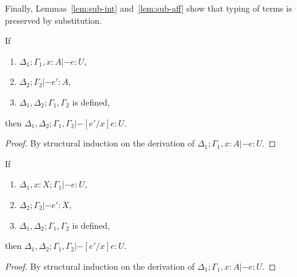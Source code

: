 Finally, Lemmas~\ref{lem:sub-int} and~\ref{lem:sub-aff} show that typing of
terms is preserved by substitution.

\begin{lemma}\label{lem:sub-int}
  If
  \begin{enumerate}
  \item $\Delta_1; \Gamma_1, x : A |- e : U$,
  \item $\Delta_2; \Gamma_2 |- e' : A$,
  \item $\Delta_1,\Delta_2 ; \Gamma_1,\Gamma_2$ is defined,
  \end{enumerate}
  then $\Delta_1,\Delta_2; \Gamma_1,\Gamma_2 |- [e'/x]e : U$.
  \begin{proof}
    By structural induction on the derivation of $\Delta_1; \Gamma_1, x : A |- e : U$.
  \end{proof}
\end{lemma}

\begin{lemma}\label{lem:sub-aff}
  If
  \begin{enumerate}
  \item $\Delta_1, x : X; \Gamma_1 |- e : U$,
  \item $\Delta_2; \Gamma_2 |- e' : X$,
  \item $\Delta_1,\Delta_2 ; \Gamma_1,\Gamma_2$ is defined,
  \end{enumerate}
  then $\Delta_1,\Delta_2; \Gamma_1,\Gamma_2 |- [e'/x]e : U$.
  \begin{proof}
    By structural induction on the derivation of $\Delta_1; \Gamma_1, x : A |- e : U$.
  \end{proof}
\end{lemma}

